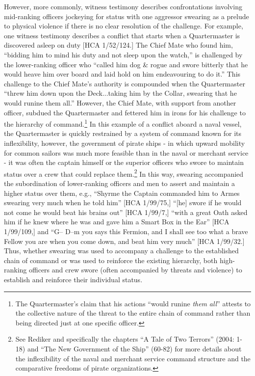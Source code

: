 However, more commonly, witness testimony describes confrontations involving mid-ranking officers jockeying for status with one aggressor swearing as a prelude to physical violence if there is no clear resolution of the challenge. For example, one witness testimony describes a conflict that starts when a Quartermaster is discovered asleep on duty [HCA 1/52/124.] The Chief Mate who found him, “bidding him to mind his duty and not sleep upon the watch,” is challenged by the lower-ranking officer who “called him dog \& rogue and swore bitterly that he would heave him over board and laid hold on him endeavouring to do it.” This challenge to the Chief Mate’s authority is compounded when the Quartermaster “threw him down upon the Deck...taking him by the Collar, swearing that he would runine them all.” However, the Chief Mate, with support from another officer, subdued the Quartermaster and fettered him in irons for his challenge to the hierarchy of command.\footnote{The Quartermaster’s claim that his actions “would runine \textit{them} \textit{all}” attests to the collective nature of the threat to the entire chain of command rather than being directed just at one specific officer.}  In this example of a conflict aboard a naval vessel, the Quartermaster is quickly restrained by a system of command known for its inflexibility, however, the government of pirate ships - in which upward mobility for common sailors was much more feasible than in the naval or merchant service - it was often the captain himself or the superior officers who swore to maintain status over a crew that could replace them.\footnote{See Rediker and specifically the chapters “A Tale of Two Terrors” (2004: 1-18) and “The New Government of the Ship” (60-82) for more details about the inflexibility of the naval and merchant service command structure and the comparative freedoms of pirate organizations.}  In this way, swearing accompanied the subordination of lower-ranking officers and men to assert and maintain a higher status over them, e.g., “Shyrme the Captain commanded him to Armes swearing very much when he told him” [HCA 1/99/75,] “[he] swore if he would not come he would beat his brains out” [HCA 1/99/7,] “with a great Oath asked him if he knew where he was and gave him a Smart Box in the Ear” [HCA 1/99/109,] and “G-- D--m you says this Fermion, and I shall see too what a brave Fellow you are when you come down, and beat him very much” [HCA 1/99/32.] Thus, whether swearing was used to accompany a challenge to the established chain of command or was used to reinforce the {existing} {hierarchy, both high-ranking officers and crew swore (often accompanied by threats and violence) to} establish and reinforce their individual status.

